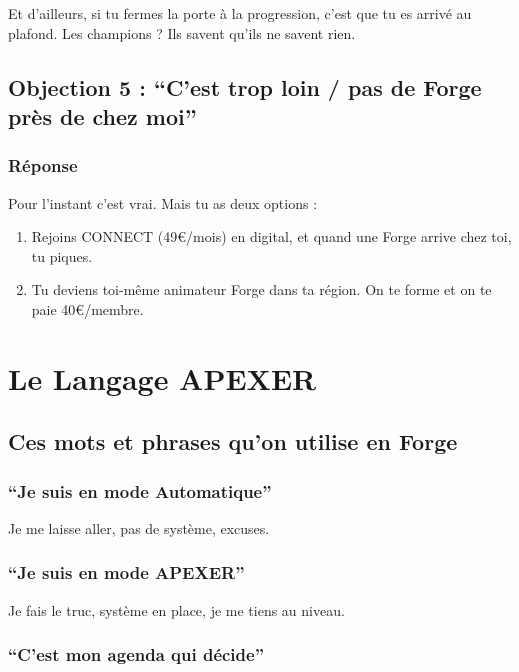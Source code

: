 \documentclass[12pt,a4paper,openany]{book}
\begin{document}
Et d'ailleurs, si tu fermes la porte à la progression, c'est que tu es arrivé au plafond. Les champions ? Ils savent qu'ils ne savent rien.

\section{Objection 5 : ``C'est trop loin / pas de Forge près de chez moi''}

\subsection{Réponse}

Pour l'instant c'est vrai. Mais tu as deux options :

\begin{enumerate}
\item Rejoins CONNECT (49\euro{}/mois) en digital, et quand une Forge arrive chez toi, tu piques.
\item Tu deviens toi-même animateur Forge dans ta région. On te forme et on te paie 40\euro{}/membre.
\end{enumerate}

\clearpage

\chapter{Le Langage APEXER}

\section{Ces mots et phrases qu'on utilise en Forge}

\subsection{``Je suis en mode Automatique''}

Je me laisse aller, pas de système, excuses.

\subsection{``Je suis en mode APEXER''}

Je fais le truc, système en place, je me tiens au niveau.

\subsection{``C'est mon agenda qui décide''}
\end{document}

